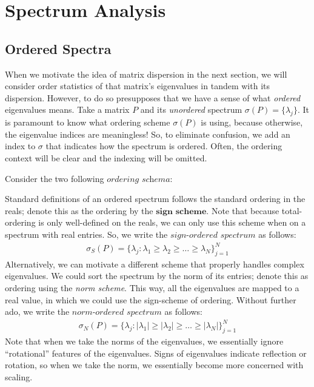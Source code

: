 \newpage
\section{Spectrum Analysis}


\subsection{Ordered Spectra}

When we motivate the idea of matrix dispersion in the next section, we will consider order statistics of that matrix's eigenvalues in tandem with its dispersion.
However, to do so presupposes that we have a sense of what \textit{ordered} eigenvalues means.
Take a matrix $P$ and its \textit{unordered} spectrum $\sigma(P) = \{\lambda_j\}$.
It is paramount to know what ordering scheme $\sigma(P)$ is using, because otherwise, the eigenvalue indices are meaningless!
So, to eliminate confusion, we add an index to $\sigma$ that indicates how the spectrum is ordered.
Often, the ordering context will be clear and the indexing will be omitted.


\noindent Consider the two following $\textit{ordering schema}$:

Standard definitions of an ordered spectrum follows the standard ordering in the reals; denote this as the ordering by the $\textbf{sign scheme}$.
Note that because total-ordering is only well-defined on the reals, we can only use this scheme when on a spectrum with real entries.
So, we write the $\textit{sign-ordered spectrum}$ as follows:
\begin{align*}
\sigma_S(P) = \{\lambda_j : \lambda_1 \geq \lambda_2 \geq \dots \geq \lambda_N\}_{j = 1}^N
\end{align*}
Alternatively, we can motivate a different scheme that properly handles complex eigenvalues.
We could sort the spectrum by the norm of its entries; denote this as ordering using the \textit{norm scheme}.
This way, all the eigenvalues are mapped to a real value, in which we could use the sign-scheme of ordering.
Without further ado, we write the $\textit{norm-ordered spectrum}$ as follows:
\begin{align*}
\sigma_N(P) = \{\lambda_j : |\lambda_1| \geq |\lambda_2| \geq \dots \geq |\lambda_N|\}_{j = 1}^N
\end{align*}
Note that when we take the norms of the eigenvalues, we essentially ignore ``rotational'' features of the eigenvalues.
Signs of eigenvalues indicate reflection or rotation, so when we take the norm, we essentially become more concerned with scaling.

